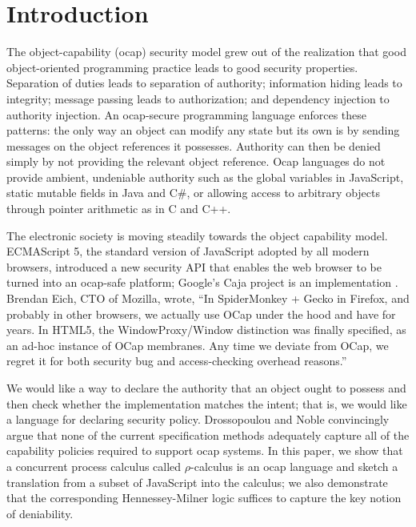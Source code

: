 \documentclass[]{amsart}
\theoremstyle{definition}
\theoremstyle{remark}
\numberwithin{equation}{subsection}
\newcommand{\rhoc}{$\rho$-calculus}
\newcommand{\paperversion}{Draft Version 0.1 - July 19, 2013}
\newenvironment{toc}
{
\begin{list}{}{
   \setlength{\leftmargin}{0.4in}
   \setlength{\rightmargin}{0.6in}
   \setlength{\parskip}{0pt}
 } \item }
{\end{list}}
\begin{document}



\section{Introduction}

The object-capability (ocap) security model grew out of the realization
that good object-oriented programming practice leads to good security properties.
Separation of duties leads to separation of authority; information hiding
leads to integrity; message passing leads to authorization; 
and dependency injection to authority injection.  An
ocap-secure programming language enforces these patterns: the only way an
object can modify any state but its own is by sending messages on the object
references it possesses.  Authority can then be denied simply by not providing
the relevant object reference. Ocap languages do not provide ambient, undeniable 
authority such as the global variables in JavaScript,
static mutable fields in Java and C\#, or allowing access to arbitrary objects
through pointer arithmetic as in C and C++.

The electronic society is moving steadily towards the object capability model.
ECMAScript 5, the standard version of JavaScript adopted by all modern
browsers, introduced a new security API that enables the web browser to
be turned into an ocap-safe platform; Google's Caja project is an implementation
\cite{Caja:2013}.  Brendan Eich, CTO of Mozilla, wrote, ``In SpiderMonkey + Gecko in 
Firefox, and probably in other browsers, we actually use OCap under the hood 
and have for years. In HTML5, the WindowProxy/Window distinction was finally 
specified, as an ad-hoc instance of OCap membranes.  Any time we deviate from 
OCap, we regret it for both security bug and access-checking overhead reasons.''
\cite{Eich:2013}

We would like a way to declare the authority that an object ought to
possess and then check whether the implementation matches the intent; that is,
we would like a language for declaring security policy.
Drossopoulou and Noble \cite{Drossopoulou:2013:NCP:2489804.2489811}
convincingly argue that none of the current specification methods
adequately capture all of the capability policies required to support
ocap systems.  In this paper, we show that a concurrent process calculus 
called \rhoc\; is an ocap language and sketch a translation from a 
subset of JavaScript into the calculus; we also demonstrate that 
the corresponding Hennessey-Milner logic suffices to capture the 
key notion of deniability.
\end{document}
